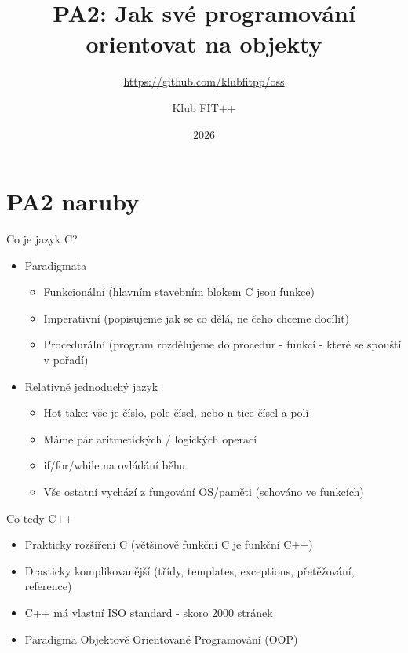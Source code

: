 \documentclass[aspectratio=1610]{beamer}
\title{PA2: Jak své programování orientovat na objekty}
\subtitle{\href{https://github.com/klubfitpp/oss}{https://github.com/klubfitpp/oss}}
\author{Klub FIT++}
\date{2026}
\begin{document}
\maketitle

\section{PA2 naruby}

\begin{frame}{Co je jazyk C?}


\begin{itemize}
  \item Paradigmata
    \begin{itemize}
      \item Funkcionální (hlavním stavebním blokem C jsou funkce)
      \item Imperativní (popisujeme jak se co dělá, ne čeho chceme docílit)
      \item Procedurální (program rozdělujeme do procedur - funkcí - které se spouští v pořadí)\cite{geeks:procedural_language}
    \end{itemize}
  \item Relativně jednoduchý jazyk
    \begin{itemize}
      \item Hot take: vše je číslo, pole čísel, nebo n-tice čísel a polí
      \item Máme pár aritmetických / logických operací
      \item if/for/while na ovládání běhu
      \item Vše ostatní vychází z fungování OS/paměti (schováno ve funkcích)
    \end{itemize}
\end{itemize}

\end{frame}

\begin{frame}{Co tedy C++}

\begin{itemize}
  \item Prakticky rozšíření C (většinově funkční C je funkční C++)
  \item Drasticky komplikovanější (třídy, templates, exceptions, přetěžování, reference)
  \item C++ má vlastní ISO standard\cite{isocpp:n4860} - skoro 2000 stránek
  \item Paradigma Objektově Orientované Programování (OOP)
\end{itemize}

\end{frame}
\end{document}
